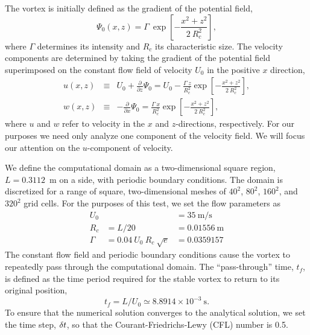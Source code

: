 \documentclass[11pt]{book}
\begin{document}
\noindent The vortex is initially defined as the gradient of the potential field,
\begin{equation}
\label{eqn_vort2d}
\Psi_{0} (x,z) = \Gamma \ \exp \left[ - \frac{x^{2} + z^{2}}{2 \ R_{c}^{2}} \right],
\end{equation}
where $\Gamma$ determines its intensity and $R_c$ its characteristic size. The velocity components are determined by taking the gradient of the potential field superimposed on the constant flow field of velocity $U_0$ in the positive $x$ direction,
\begin{eqnarray}
\label{eqn_uvel}
u (x,z) &\equiv& U_{0} + \frac{\partial}{\partial z} \Psi_{0} = U_{0} - \frac{\Gamma \ z}{R_{c}^{2}} \exp \left[ - \frac{x^{2} + z^{2}}{2 \ R_{c}^{2}} \right], \\
w (x,z) &\equiv& - \frac{\partial}{\partial x} \Psi_{0} = \frac{\Gamma \ x}{R_{c}^{2}} \exp \left[ - \frac{x^{2} + z^{2}}{2 \ R_{c}^{2}} \right],
\end{eqnarray}
where $u$ and $w$ refer to velocity in the $x$ and $z$-directions, respectively. For our purposes we need only analyze one component of the velocity field. We will focus our attention on the $u$-component of velocity.

We define the computational domain as a two-dimensional square region, $L=0.3112$~m on a side, with periodic boundary conditions. The domain is discretized for a range of square, two-dimensional meshes of $40^{2}$, $80^{2}$, $160^{2}$, and $320^{2}$ grid cells. For the purposes of this test, we set the flow parameters as
\[
\begin{array}{lll}
U_{0} &&= 35 \ \mathrm{m/s} \\
R_{c} &= L / 20 &= 0.01556 \ \mathrm{m} \\
\Gamma &= 0.04 \ U_{0} \ R_{c} \ \sqrt{e} &= 0.0359157
\end{array}
\]
The constant flow field and periodic boundary conditions cause the vortex to repeatedly pass through the computational domain. The ``pass-through'' time, $t_{f}$, is defined as the time period required for the stable vortex to return to its original position,
\begin{equation*}
t_{f} = L / U_{0} \simeq 8.8914 \times 10^{-3} \ \mathrm{s}.
\end{equation*}
To ensure that the numerical solution converges to the analytical solution, we set the time step, $\delta t$, so that the Courant-Friedrichs-Lewy (CFL) number is 0.5.
\end{document}
